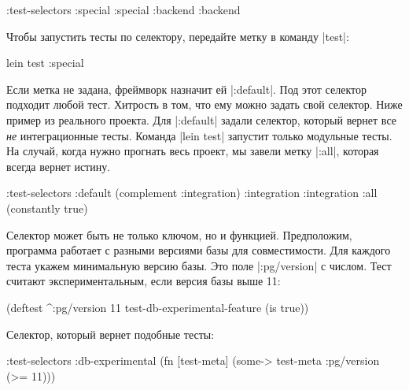 \begin{english}
  \begin{clojure}
:test-selectors {:special :special
                 :backend :backend}
  \end{clojure}
\end{english}

Чтобы запустить тесты по селектору, передайте метку в команду \spverb|test|:

\begin{english}
  \begin{clojure}
lein test :special
  \end{clojure}
\end{english}

Если метка не задана, фреймворк назначит ей \spverb|:default|. Под этот селектор
подходит любой тест. Хитрость в том, что ему можно задать свой селектор. Ниже
пример из реального проекта. Для \spverb|:default| задали селектор, который
вернет все \emph{не} интеграционные тесты. Команда \spverb|lein test| запустит
только модульные тесты. На случай, когда нужно прогнать весь проект, мы завели
метку \spverb|:all|, которая всегда вернет истину.

\begin{english}
  \begin{clojure}
:test-selectors {:default (complement :integration)
                 :integration :integration
                 :all (constantly true)}
  \end{clojure}
\end{english}

Селектор может быть не только ключом, но и функцией. Предположим, программа
работает с разными версиями базы для совместимости. Для каждого теста укажем
минимальную версию базы. Это поле \spverb|:pg/version| с числом. Тест считают
экспериментальным, если версия базы выше 11:

\begin{english}
  \begin{clojure}
(deftest ^{:pg/version 11}
  test-db-experimental-feature
  (is true))
  \end{clojure}
\end{english}

\noindent
Селектор, который вернет подобные тесты:

\begin{english}
  \begin{clojure}
:test-selectors
{:db-experimental
 (fn [test-meta]
   (some-> test-meta :pg/version (>= 11)))}
  \end{clojure}
\end{english}

